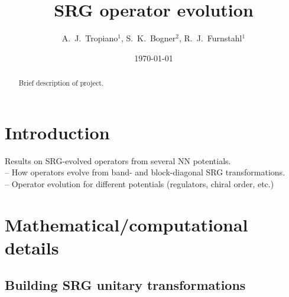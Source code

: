 \documentclass[preprintnumbers,floatfix,aps,prc,preprint,nofootinbib]{revtex4-1}
\begin{document}
\title{SRG operator evolution}


\author{A.~J.~Tropiano$^{1}$, S.~K.~Bogner$^{2}$, R.~J.~Furnstahl$^{1}$}


\date{\today}

\begin{abstract}

Brief description of project.

\end{abstract}

\maketitle

\tableofcontents

\newpage


\section{Introduction}
\label{sec:intro}


Results on SRG-evolved operators from several NN potentials.
\\
-- How operators evolve from band- and block-diagonal SRG transformations.
\\
-- Operator evolution for different potentials (regulators, chiral order, etc.)


\section{Mathematical/computational details}
\label{sec:math_comp_details}


\subsection{Building SRG unitary transformations}
\label{sec:srg_unitary_transformations}
\end{document}
